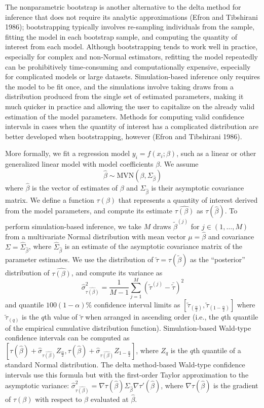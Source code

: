 The nonparametric bootstrap is another alternative to the delta method for inference that does not require its analytic approximations (Efron and Tibshirani 1986); bootstrapping typically involves re-sampling individuals from the sample, fitting the model in each bootstrap sample, and computing the quantity of interest from each model. Although bootstrapping tends to work well in practice, especially for complex and non-Normal estimators, refitting the model repeatedly can be prohibitively time-consuming and computationally expensive, especially for complicated models or large datasets. Simulation-based inference only requires the model to be fit once, and the simulations involve taking draws from a distribution produced from the single set of estimated parameters, making it much quicker in practice and allowing the user to capitalize on the already valid estimation of the model parameters. Methods for computing valid confidence intervals in cases when the quantity of interest has a complicated distribution are better developed when bootstrapping, however (Efron and Tibshirani 1986).

More formally, we fit a regression model \(y_i = f(x_i; \beta)\), such as a linear or other generalized linear model with model coefficients \(\beta\). We assume\[
\hat{\beta} \sim \text{MVN}(\beta, \Sigma_{\hat{\beta}})
\]where \(\hat{\beta}\) is the vector of estimates of \(\beta\) and \(\Sigma_{\hat{\beta}}\) is their asymptotic covariance matrix. We define a function \(\tau(\beta)\) that represents a quantity of interest derived from the model parameters, and compute its estimate \(\widehat{\tau(\beta)}\) as \(\tau(\hat{\beta})\). To perform simulation-based inference, we take \(M\) draws \(\tilde{\beta}^{(j)}\) for \(j\in(1, \dots, M)\) from a multivariate Normal distribution with mean vector \(\mu = \hat{\beta}\) and covariance \(\Sigma = \hat{\Sigma}_{\hat{\beta}}\), where \(\hat{\Sigma}_{\hat{\beta}}\) is an estimate of the asymptotic covariance matrix of the parameter estimates. We use the distribution of \(\tilde{\tau}=\tau(\tilde{\beta})\) as the ``posterior'' distribution of \(\widehat{\tau(\beta)}\), and compute its variance as\[
\hat\sigma^2_{\widehat{\tau(\beta)}} = \frac{1}{M-1}\sum^M_{j=1}{(\tilde{\tau}^{(j)} - \bar{\tilde{\tau}})^2}
\]and quantile \(100(1-\alpha)\%\) confidence interval limits as \(\left[\tilde{\tau}_{(\frac{\alpha}{2})}, \tilde{\tau}_{(1-\frac{\alpha}{2})}\right]\) where \(\tilde{\tau}_{(q)}\) is the \(q\)th value of \(\tilde{\tau}\) when arranged in ascending order (i.e., the \(q\)th quantile of the empirical cumulative distribution function). Simulation-based Wald-type confidence intervals can be computed as \(\left[\tau(\hat{\beta}) + \hat\sigma_{\widehat{\tau(\beta)}} Z_{\frac{\alpha}{2}}, \tau(\hat{\beta}) + \hat\sigma_{\widehat{\tau(\beta)}} Z_{1-\frac{\alpha}{2}} \right]\), where \(Z_q\) is the \(q\)th quantile of a standard Normal distribution. The delta method-based Wald-type confidence intervals use this formula but with the first-order Taylor approximation to the asymptotic variance: \(\hat\sigma^2_{\widehat{\tau(\beta)}}=\nabla\tau(\hat{\beta}) \Sigma_{\hat{\beta}} \nabla\tau'(\hat{\beta})\), where \(\nabla\tau(\hat{\beta})\) is the gradient of \(\tau(\beta)\) with respect to \(\beta\) evaluated at \(\hat{\beta}\).

